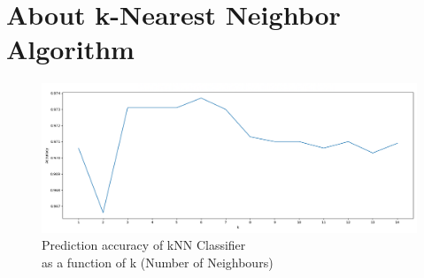 \section*{About k-Nearest Neighbor Algorithm}

\lipsum[1-1]

\begin{figure}[H]
    \centering
    \includegraphics[width=\textwidth]{images/knn.png}
    \caption*{Prediction accuracy of kNN Classifier \\
    as a function of k (Number of Neighbours)}
    \setlength{\belowcaptionskip}{-20pt}
    \setlength{\abovecaptionskip}{-20pt}
\end{figure}



